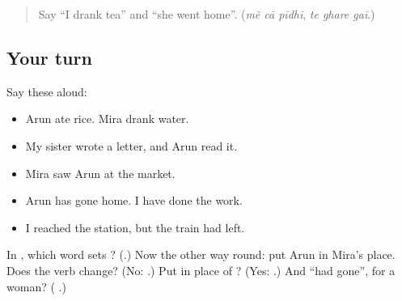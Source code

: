 \label{lesson:GU-R273-who-did-it}



\begin{quote}
Say \textquotedblleft{}I drank tea\textquotedblright{} and \textquotedblleft{}she went home\textquotedblright{}. (\emph{mẽ cā pīdhī}, \emph{te ghare gaī}.)
\end{quote}

\subsection*{Your turn}
Say these aloud:

\begin{itemize}
\raggedright
  \item Arun ate rice. Mira drank water.
  \item My sister wrote a letter, and Arun read it.
  \item Mira saw Arun at the market.
  \item Arun has gone home. I have done the work.
  \item I reached the station, but the train had left.
\end{itemize}

\begin{tcolorbox}[breakable,colback=teal!4,colframe=teal!35!black,title={Before you move on}]
In \textbf{  }, which word sets \textbf{}? (\textbf{}.) Now the other way round: put Arun in Mira's place. Does the verb change? (No: \textbf{  }.) Put \textbf{} in place of \textbf{}? (Yes: \textbf{}.) And \textquotedblleft{}had gone\textquotedblright{}, for a woman? (\textbf{ }.)
\end{tcolorbox}
